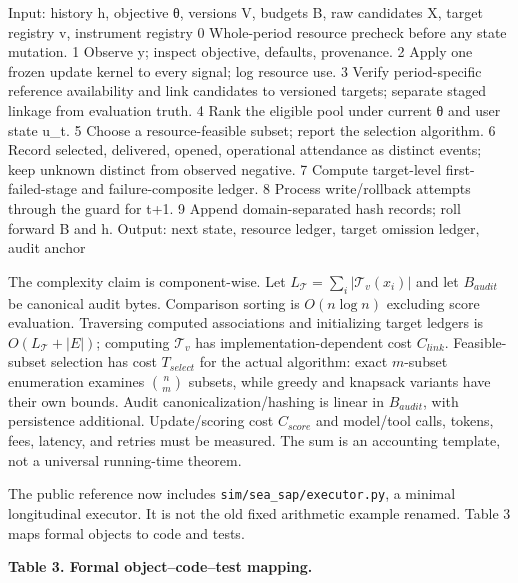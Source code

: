 \documentclass[
  11pt]{article}
\newenvironment{Shaded}{}{}
\newcommand{\NormalTok}[1]{#1}
\begin{document}
\begin{Shaded}
\begin{Highlighting}[]
\NormalTok{Input: history h, objective θ, versions V, budgets B,}
\NormalTok{       raw candidates X, target registry v, instrument registry}
\NormalTok{ 0  Whole{-}period resource precheck before any state mutation.}
\NormalTok{ 1  Observe y; inspect objective, defaults, provenance.}
\NormalTok{ 2  Apply one frozen update kernel to every signal; log resource use.}
\NormalTok{ 3  Verify period{-}specific reference availability and link candidates}
\NormalTok{    to versioned targets; separate staged linkage from evaluation truth.}
\NormalTok{ 4  Rank the eligible pool under current θ and user state u\_t.}
\NormalTok{ 5  Choose a resource{-}feasible subset; report the selection algorithm.}
\NormalTok{ 6  Record selected, delivered, opened, operational attendance as}
\NormalTok{    distinct events; keep unknown distinct from observed negative.}
\NormalTok{ 7  Compute target{-}level first{-}failed{-}stage and failure{-}composite ledger.}
\NormalTok{ 8  Process write/rollback attempts through the guard for t+1.}
\NormalTok{ 9  Append domain{-}separated hash records; roll forward B and h.}
\NormalTok{Output: next state, resource ledger, target omission ledger, audit anchor}
\end{Highlighting}
\end{Shaded}

The complexity claim is component-wise. Let
\(L_{\mathcal T}=\sum_i|\mathcal T_v(x_i)|\) and let \(B_{audit}\) be
canonical audit bytes. Comparison sorting is \(O(n\log n)\) excluding
score evaluation. Traversing computed associations and initializing
target ledgers is \(O(L_{\mathcal T}+|E|)\); computing \(\mathcal T_v\)
has implementation-dependent cost \(C_{link}\). Feasible-subset
selection has cost \(T_{select}\) for the actual algorithm: exact
\(m\)-subset enumeration examines \(\binom nm\) subsets, while greedy
and knapsack variants have their own bounds. Audit
canonicalization/hashing is linear in \(B_{audit}\), with persistence
additional. Update/scoring cost \(C_{score}\) and model/tool calls,
tokens, fees, latency, and retries must be measured. The sum is an
accounting template, not a universal running-time theorem.

The public reference now includes \texttt{sim/sea\_sap/executor.py}, a
minimal longitudinal executor. It is not the old fixed arithmetic
example renamed. Table 3 maps formal objects to code and tests.

\textbf{Table 3. Formal object--code--test mapping.}
\end{document}
